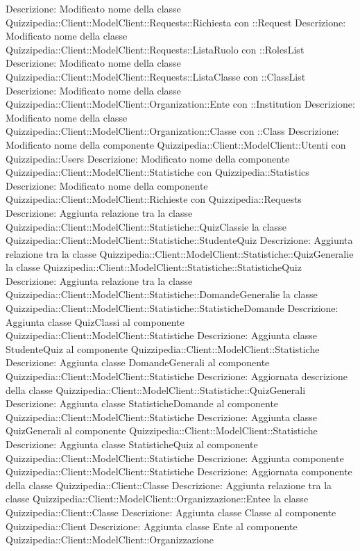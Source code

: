 Descrizione: Modificato nome della classe Quizzipedia::Client::ModelClient::Requests::Richiesta con ::Request 
Descrizione: Modificato nome della classe Quizzipedia::Client::ModelClient::Requests::ListaRuolo con ::RolesList 
Descrizione: Modificato nome della classe Quizzipedia::Client::ModelClient::Requests::ListaClasse con ::ClassList 
Descrizione: Modificato nome della classe Quizzipedia::Client::ModelClient::Organization::Ente con ::Institution 
Descrizione: Modificato nome della classe Quizzipedia::Client::ModelClient::Organization::Classe con ::Class 
Descrizione: Modificato nome della componente Quizzipedia::Client::ModelClient::Utenti con Quizzipedia::Users 
Descrizione: Modificato nome della componente Quizzipedia::Client::ModelClient::Statistiche con Quizzipedia::Statistics 
Descrizione: Modificato nome della componente Quizzipedia::Client::ModelClient::Richieste con Quizzipedia::Requests 
Descrizione: Aggiunta relazione tra la classe Quizzipedia::Client::ModelClient::Statistiche::QuizClassie la classe Quizzipedia::Client::ModelClient::Statistiche::StudenteQuiz 
Descrizione: Aggiunta relazione tra la classe Quizzipedia::Client::ModelClient::Statistiche::QuizGeneralie la classe Quizzipedia::Client::ModelClient::Statistiche::StatisticheQuiz 
Descrizione: Aggiunta relazione tra la classe Quizzipedia::Client::ModelClient::Statistiche::DomandeGeneralie la classe Quizzipedia::Client::ModelClient::Statistiche::StatisticheDomande 
Descrizione: Aggiunta classe QuizClassi al componente Quizzipedia::Client::ModelClient::Statistiche 
Descrizione: Aggiunta classe StudenteQuiz al componente Quizzipedia::Client::ModelClient::Statistiche 
Descrizione: Aggiunta classe DomandeGenerali al componente Quizzipedia::Client::ModelClient::Statistiche 
Descrizione: Aggiornata descrizione della classe Quizzipedia::Client::ModelClient::Statistiche::QuizGenerali 
Descrizione: Aggiunta classe StatisticheDomande al componente Quizzipedia::Client::ModelClient::Statistiche 
Descrizione: Aggiunta classe QuizGenerali al componente Quizzipedia::Client::ModelClient::Statistiche 
Descrizione: Aggiunta classe StatisticheQuiz al componente Quizzipedia::Client::ModelClient::Statistiche 
Descrizione: Aggiunta componente Quizzipedia::Client::ModelClient::Statistiche 
Descrizione: Aggiornata componente della classe Quizzipedia::Client::Classe 
Descrizione: Aggiunta relazione tra la classe Quizzipedia::Client::ModelClient::Organizzazione::Entee la classe Quizzipedia::Client::Classe 
Descrizione: Aggiunta classe Classe al componente Quizzipedia::Client 
Descrizione: Aggiunta classe Ente al componente Quizzipedia::Client::ModelClient::Organizzazione 
